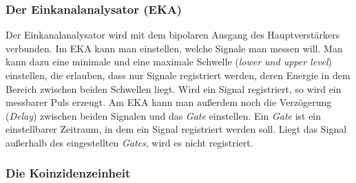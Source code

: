 \subsubsection{Der Einkanalanalysator (EKA)}

Der Einkanalanalysator wird mit dem bipolaren Ausgang des Hauptverstärkers verbunden. Im EKA kann man einstellen, welche Signale man messen will. Man kann dazu eine minimale und eine maximale Schwelle (\emph{lower und upper level}) einstellen, die erlauben, dass nur Signale registriert werden, deren Energie in dem Bereich zwischen beiden Schwellen liegt. Wird ein Signal registriert, so wird ein messbarer Puls erzeugt. Am EKA kann man außerdem noch die Verzögerung (\emph{Delay}) zwischen beiden Signalen und das \emph{Gate} einstellen. Ein \emph{Gate} ist ein einstellbarer Zeitraum, in dem ein Signal registriert werden soll. Liegt das Signal außerhalb des eingestellten \emph{Gates}, wird es nicht registriert. 

\subsubsection{Die Koinzidenzeinheit}

















